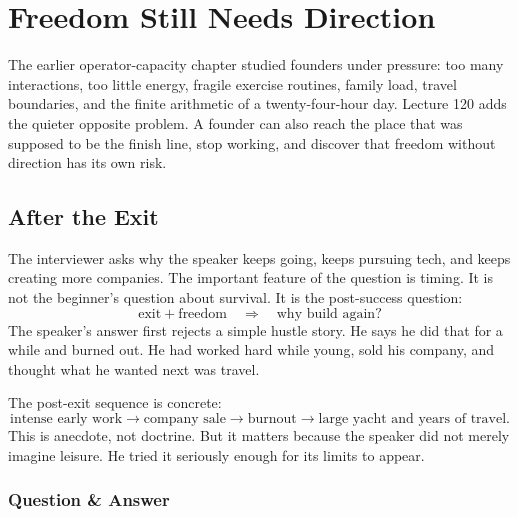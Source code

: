 \documentclass[11pt,oneside]{book}
\begin{document}

\chapter{Freedom Still Needs Direction}

The earlier operator-capacity chapter studied founders under pressure: too many interactions, too little energy, fragile exercise routines, family load, travel boundaries, and the finite arithmetic of a twenty-four-hour day. Lecture 120 adds the quieter opposite problem. A founder can also reach the place that was supposed to be the finish line, stop working, and discover that freedom without direction has its own risk.

\section{After the Exit}

The interviewer asks why the speaker keeps going, keeps pursuing tech, and keeps creating more companies. The important feature of the question is timing. It is not the beginner's question about survival. It is the post-success question:
\[
\text{exit}+\text{freedom}
\quad\Longrightarrow\quad
\text{why build again?}
\]
The speaker's answer first rejects a simple hustle story. He says he did that for a while and burned out. He had worked hard while young, sold his company, and thought what he wanted next was travel.

The post-exit sequence is concrete:
\[
\text{intense early work}
\longrightarrow
\text{company sale}
\longrightarrow
\text{burnout}
\longrightarrow
\text{large yacht and years of travel}.
\]
This is anecdote, not doctrine. But it matters because the speaker did not merely imagine leisure. He tried it seriously enough for its limits to appear.

\subsection{Question \& Answer}
\end{document}
